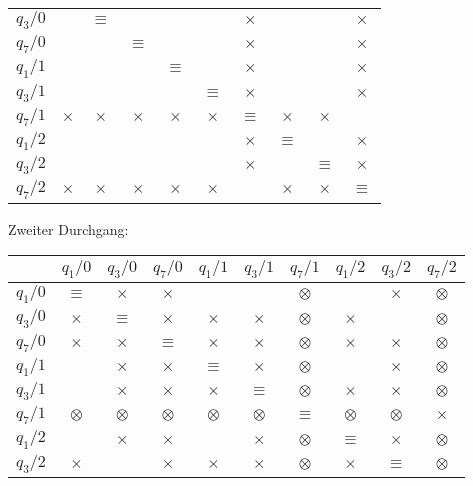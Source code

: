 \begin{loesung}
\begin{teilaufgaben}
\begin{center}
\begin{tabular}{|c|ccccccccc|}
$q_3/0$  &         &$\equiv$ &         &         &         &$\times$ &         &         &$\times$ \\
$q_7/0$  &         &         &$\equiv$ &         &         &$\times$ &         &         &$\times$ \\
$q_1/1$  &         &         &         &$\equiv$ &         &$\times$ &         &         &$\times$ \\
$q_3/1$  &         &         &         &         &$\equiv$ &$\times$ &         &         &$\times$ \\
$q_7/1$  &$\times$ &$\times$ &$\times$ &$\times$ &$\times$ &$\equiv$ &$\times$ &$\times$ &         \\
$q_1/2$  &         &         &         &         &         &$\times$ &$\equiv$ &         &$\times$ \\
$q_3/2$  &         &         &         &         &         &$\times$ &         &$\equiv$ &$\times$ \\
$q_7/2$  &$\times$ &$\times$ &$\times$ &$\times$ &$\times$ &         &$\times$ &$\times$ &$\equiv$ \\
\hline
\end{tabular}
\end{center}
Zweiter Durchgang:
\begin{center}
\begin{tabular}{|c|ccccccccc|}
\hline
         &$q_1/0$  &$q_3/0$  &$q_7/0$  &$q_1/1$  &$q_3/1$  &$q_7/1$  &$q_1/2$  &$q_3/2$  &$q_7/2$  \\
\hline
$q_1/0$  &$\equiv$ &$\times$ &$\times$ &         &         &$\otimes$&         &$\times$ &$\otimes$\\
$q_3/0$  &$\times$ &$\equiv$ &$\times$ &$\times$ &$\times$ &$\otimes$&$\times$ &         &$\otimes$\\
$q_7/0$  &$\times$ &$\times$ &$\equiv$ &$\times$ &$\times$ &$\otimes$&$\times$ &$\times$ &$\otimes$\\
$q_1/1$  &         &$\times$ &$\times$ &$\equiv$ &$\times$ &$\otimes$&         &$\times$ &$\otimes$\\
$q_3/1$  &         &$\times$ &$\times$ &$\times$ &$\equiv$ &$\otimes$&$\times$ &$\times$ &$\otimes$\\
$q_7/1$  &$\otimes$&$\otimes$&$\otimes$&$\otimes$&$\otimes$&$\equiv$ &$\otimes$&$\otimes$&$\times$ \\
$q_1/2$  &         &$\times$ &$\times$ &         & $\times$&$\otimes$&$\equiv$& $\times$&$\otimes$\\
$q_3/2$  &$\times$ &         &$\times$ &$\times$ &$\times$ &$\otimes$&$\times$ &$\equiv$ &$\otimes$\\

\end{tabular}
\end{center}
\end{teilaufgaben}
\end{loesung}
